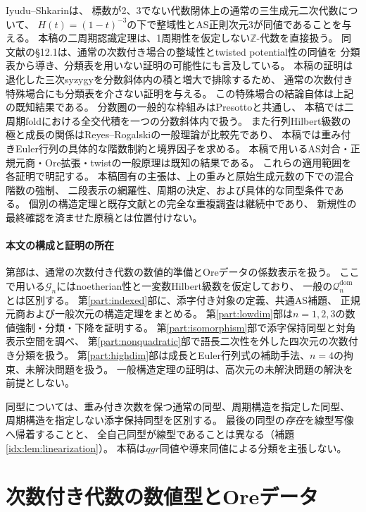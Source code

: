 \documentclass[11pt,a4paper]{ltjsarticle}
\theoremstyle{definition}
\begin{document}
Iyudu--Shkarin\cite[Theorem 1.11, Remark 1.15, \S12.1]{ISclass}は、
標数が2、3でない代数閉体上の通常の三生成元二次代数について、
$H(t)=(1-t)^{-3}$の下で整域性とAS正則次元3が同値であることを与える。
本稿の二周期認識定理は、1周期性を仮定しない$\mathbb Z$-代数を直接扱う。
同文献の\S12.1は、通常の次数付き場合の整域性とtwisted potential性の同値を
分類表から導き、分類表を用いない証明の可能性にも言及している。
本稿の証明は退化した三次syzygyを分数斜体内の積と増大で排除するため、
通常の次数付き特殊場合にも分類表を介さない証明を与える。
この特殊場合の結論自体は上記の既知結果である。
分数圏の一般的な枠組みはPresotto\cite[Proposition 2.11]{Presotto}と共通し、
本稿では二周期foldにおける全交代積を一つの分数斜体内で扱う。
また行列Hilbert級数の極と成長の関係はReyes--Rogalski\cite[Proposition 2.8]{RRgrowth}の一般理論が比較先であり、
本稿では重み付きEuler行列の具体的な階数制約と境界因子を求める。
本稿で用いるAS対合・正規元商・Ore拡張・twistの一般原理は既知の結果である。
これらの適用範囲を各証明で明記する。
本稿固有の主張は、上の重みと原始生成元数の下での混合階数の強制、
二段表示の網羅性、周期の決定、および具体的な同型条件である。
個別の構造定理と既存文献との完全な重複調査は継続中であり、
新規性の最終確認を済ませた原稿とは位置付けない。

\subsection{本文の構成と証明の所在}
第\ref{part:graded}部は、通常の次数付き代数の数値的準備とOreデータの係数表示を扱う。
ここで用いる$\mathcal G_n$にはnoetherian性と一変数Hilbert級数を仮定しており、
一般の$\mathcal Q_n^{\mathrm{dom}}$とは区別する。
第\ref{part:indexed}部に、添字付き対象の定義、共通AS補題、
正規元商および一般次元の構造定理をまとめる。
第\ref{part:lowdim}部は$n=1,2,3$の数値強制・分類・下降を証明する。
第\ref{part:isomorphism}部で添字保持同型と対角表示空間を調べ、
第\ref{part:nonquadratic}部で語長二次性を外した四次元の次数付き分類を扱う。
第\ref{part:highdim}部は成長とEuler行列式の補助手法、$n=4$の拘束、未解決問題を扱う。
一般構造定理の証明は、高次元の未解決問題の解決を前提としない。

同型については、重み付き次数を保つ通常の同型、周期構造を指定した同型、
周期構造を指定しない添字保持同型を区別する。
最後の同型の\emph{存在}を線型写像へ帰着することと、
全自己同型が線型であることは異なる（補題\ref{idx:lem:linearization}）。
本稿は$qgr$同値や導来同値による分類を主張しない。


\clearpage
\part{次数付き代数の数値型とOreデータ}\label{part:graded}
\end{document}
